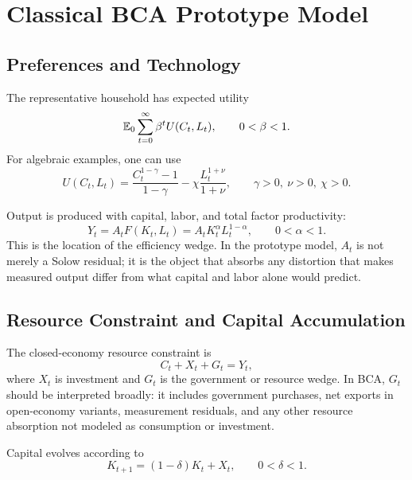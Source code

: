 \section{Classical BCA Prototype Model}

\subsection{Preferences and Technology}

The representative household has expected utility
\begin{equation}
    \mathbb{E}_0
    \sum_{t=0}^{\infty}
    \beta^t U(C_t,L_t),
    \qquad 0<\beta<1.
    \label{eq:utility}
\end{equation}
For algebraic examples, one can use
\begin{equation}
    U(C_t,L_t)
    =
    \frac{C_t^{1-\gamma}-1}{1-\gamma}
    -
    \chi\frac{L_t^{1+\nu}}{1+\nu},
    \qquad
    \gamma>0,\ \nu>0,\ \chi>0.
    \label{eq:period_utility_example}
\end{equation}

Output is produced with capital, labor, and total factor productivity:
\begin{equation}
    Y_t
    =
    A_t F(K_t,L_t)
    =
    A_t K_t^\alpha L_t^{1-\alpha},
    \qquad 0<\alpha<1.
    \label{eq:production}
\end{equation}
This is the location of the efficiency wedge. In the prototype model,
\(A_t\) is not merely a Solow residual; it is the object that absorbs any
distortion that makes measured output differ from what capital and labor alone
would predict.

\subsection{Resource Constraint and Capital Accumulation}

The closed-economy resource constraint is
\begin{equation}
    C_t + X_t + G_t = Y_t,
    \label{eq:resource}
\end{equation}
where \(X_t\) is investment and \(G_t\) is the government or resource wedge. In
BCA, \(G_t\) should be interpreted broadly: it includes government purchases,
net exports in open-economy variants, measurement residuals, and any other
resource absorption not modeled as consumption or investment.

Capital evolves according to
\begin{equation}
    K_{t+1}
    =
    (1-\delta)K_t + X_t,
    \qquad 0<\delta<1.
    \label{eq:capital_accumulation}
\end{equation}

